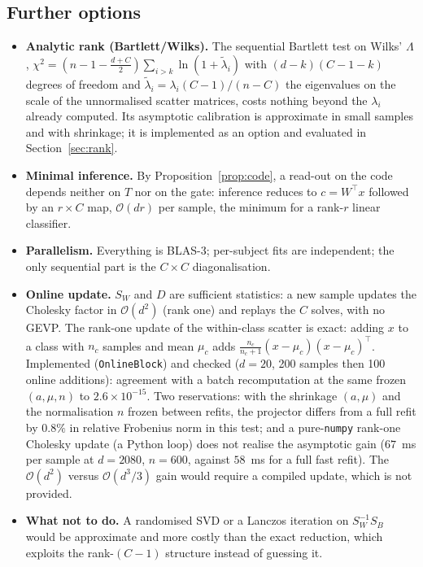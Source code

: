 \documentclass[11pt,a4paper]{article}
\theoremstyle{plain}
\theoremstyle{definition}
\theoremstyle{remark}
\newcommand{\T}{\top}
\begin{document}
\subsection{Further options}
\begin{itemize}
  \item \textbf{Analytic rank (Bartlett/Wilks).} The sequential Bartlett test
  on Wilks' $\Lambda$, $\chi^2=(n-1-\tfrac{d+C}2)\sum_{i>k}\ln(1+\tilde\lambda_i)$
  with $(d-k)(C-1-k)$ degrees of freedom and
  $\tilde\lambda_i=\lambda_i(C-1)/(n-C)$ the eigenvalues on the scale of the
  unnormalised scatter matrices, costs nothing beyond the $\lambda_i$ already
  computed. Its asymptotic calibration is approximate in
  small samples and with shrinkage; it is implemented as an option and
  evaluated in Section~\ref{sec:rank}.
  \item \textbf{Minimal inference.} By Proposition~\ref{prop:code}, a read-out
  on the code depends neither on $T$ nor on the gate: inference reduces to
  $c=W^\T x$ followed by an $r\times C$ map, $\mathcal O(dr)$ per sample, the
  minimum for a rank-$r$ linear classifier.
  \item \textbf{Parallelism.} Everything is BLAS-3; per-subject fits are
  independent; the only sequential part is the $C\times C$ diagonalisation.
  \item \textbf{Online update.} $S_W$ and $D$ are sufficient statistics: a
  new sample updates the Cholesky factor in $\mathcal O(d^2)$ (rank one) and
  replays the $C$ solves, with no GEVP. The rank-one update of the
  within-class scatter is exact: adding $x$ to a class with $n_c$ samples and
  mean $\mu_c$ adds $\tfrac{n_c}{n_c+1}(x-\mu_c)(x-\mu_c)^\T$. Implemented
  (\texttt{OnlineBlock}) and checked ($d=20$, 200 samples then 100 online
  additions): agreement with a batch recomputation at the same frozen
  $(a,\mu,n)$ to $2.6\times10^{-15}$. Two reservations: with the shrinkage
  $(a,\mu)$ and the normalisation $n$ frozen between refits, the projector
  differs from a full refit by $0.8\%$ in relative Frobenius norm in this
  test; and a pure-\texttt{numpy} rank-one Cholesky update (a Python loop)
  does not realise the asymptotic gain ($67$~ms per sample at $d=2080$,
  $n=600$, against $58$~ms for a full fast refit). The $\mathcal O(d^2)$
  versus $\mathcal O(d^3/3)$ gain would require a compiled update, which is
  not provided.
  \item \textbf{What not to do.} A randomised SVD or a Lanczos iteration on
  $S_W^{-1}S_B$ would be approximate and more costly than the exact
  reduction, which exploits the rank-$(C-1)$ structure instead of guessing it.
\end{itemize}
\end{document}
